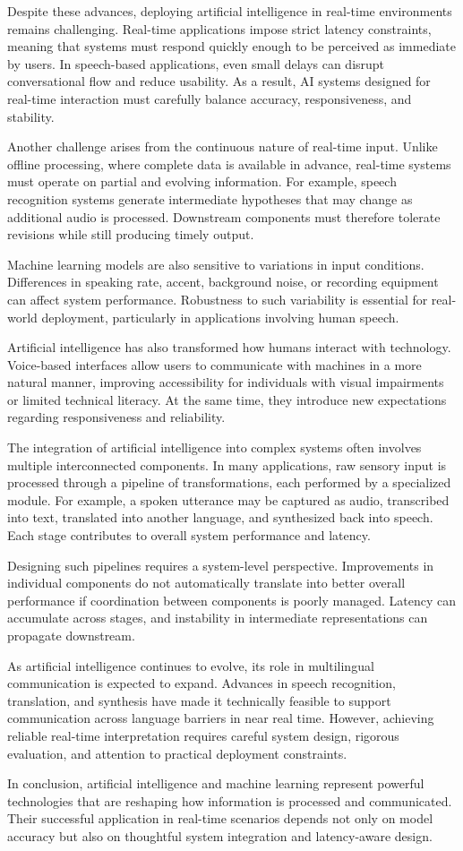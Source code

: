 Despite these advances, deploying artificial intelligence in real-time environments remains challenging. Real-time applications impose strict latency constraints, meaning that systems must respond quickly enough to be perceived as immediate by users. In speech-based applications, even small delays can disrupt conversational flow and reduce usability. As a result, AI systems designed for real-time interaction must carefully balance accuracy, responsiveness, and stability.

Another challenge arises from the continuous nature of real-time input. Unlike offline processing, where complete data is available in advance, real-time systems must operate on partial and evolving information. For example, speech recognition systems generate intermediate hypotheses that may change as additional audio is processed. Downstream components must therefore tolerate revisions while still producing timely output.

Machine learning models are also sensitive to variations in input conditions. Differences in speaking rate, accent, background noise, or recording equipment can affect system performance. Robustness to such variability is essential for real-world deployment, particularly in applications involving human speech.

Artificial intelligence has also transformed how humans interact with technology. Voice-based interfaces allow users to communicate with machines in a more natural manner, improving accessibility for individuals with visual impairments or limited technical literacy. At the same time, they introduce new expectations regarding responsiveness and reliability.

The integration of artificial intelligence into complex systems often involves multiple interconnected components. In many applications, raw sensory input is processed through a pipeline of transformations, each performed by a specialized module. For example, a spoken utterance may be captured as audio, transcribed into text, translated into another language, and synthesized back into speech. Each stage contributes to overall system performance and latency.

Designing such pipelines requires a system-level perspective. Improvements in individual components do not automatically translate into better overall performance if coordination between components is poorly managed. Latency can accumulate across stages, and instability in intermediate representations can propagate downstream.

As artificial intelligence continues to evolve, its role in multilingual communication is expected to expand. Advances in speech recognition, translation, and synthesis have made it technically feasible to support communication across language barriers in near real time. However, achieving reliable real-time interpretation requires careful system design, rigorous evaluation, and attention to practical deployment constraints.

In conclusion, artificial intelligence and machine learning represent powerful technologies that are reshaping how information is processed and communicated. Their successful application in real-time scenarios depends not only on model accuracy but also on thoughtful system integration and latency-aware design.